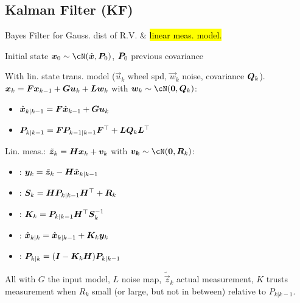 \subsection{Kalman Filter (KF)}
Bayes Filter for Gauss. dist of R.V. \& \hl{linear meas. model.}

Initial state $\vec{x}_0 \sim \cN(\hat{\vec{x}}, \mat{P}_0)$, $\bm{P}_0$ previous covariance

 With lin. state trans. model ($\vec{u}_k$ wheel spd, $\vec{w}_k$ noise, covariance $\bm{Q}_k$).
$\bm{x}_k = \bm{F}\bm{x}_{k - 1} + \bm{G}\bm{u}_k + \bm{L}\bm{w}_k$ with $\vec{w}_k \sim \cN(\vec{0}, \mat{Q}_k)$:
\begin{itemize}
    \item {} $\hat{\bm{x}}_{k | k - 1} = \bm{F} \hat{\bm{x}}_{k - 1} + \bm{G} \bm{u}_k$
    \item {} $\bm{P}_{k | k - 1} = \bm{F} \bm{P}_{k - 1 | k - 1} \bm{F}^\top + \bm{L} \bm{Q}_{k} \bm{L}^\top$
\end{itemize}
 Lin. meas.: $\tilde{\bm{z}}_k = \bm{H}\bm{x}_k + \bm{v}_k$ with $\vec{v_k} \sim \cN(\vec{0}, \mat{R}_k)$:
\begin{itemize}
    \item {}: $\bm{y}_k = \tilde{\bm{z}}_k - \bm{H} \hat{\bm{x}}_{k | k - 1}$
    \item {}: $\bm{S}_k = \bm{H}\bm{P}_{k | k - 1} \bm{H}^\top + \bm{R}_k$
    \item {}: $\bm{K}_k = \bm{P}_{k | k - 1} \bm{H}^\top \bm{S}_k^{-1}$
    \item {}: $\hat{\bm{x}}_{k | k} = \hat{\bm{x}}_{k | k - 1} + \bm{K}_k \bm{y}_k$
    \item {}: $\bm{P}_{k | k} = (\bm{I} - \bm{K}_k \bm{H}) \bm{P}_{k | k - 1}$
\end{itemize}
All with $G$ the input model, $L$ noise map, $\tilde{\vec{z}}_k$ actual measurement,
$K$ trusts measurement when $R_k$ small (or large, but not in between) relative to $P_{k | k - 1}$.
